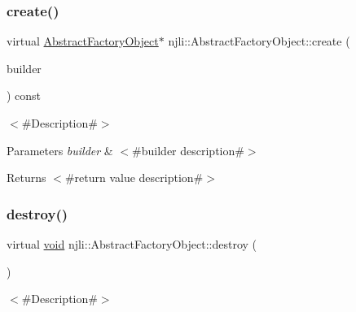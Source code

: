 \subsubsection{\texorpdfstring{create()}{create()}}
{\footnotesize\ttfamily virtual \mbox{\hyperlink{classnjli_1_1_abstract_factory_object}{Abstract\+Factory\+Object}}$\ast$ njli\+::\+Abstract\+Factory\+Object\+::create (\begin{DoxyParamCaption}\item[{const \mbox{\hyperlink{classnjli_1_1_abstract_builder}{Abstract\+Builder}} \&}]{builder }\end{DoxyParamCaption}) const\hspace{0.3cm}{\ttfamily [virtual]}}

$<$\#\+Description\#$>$


\begin{DoxyParams}{Parameters}
{\em builder} & $<$\#builder description\#$>$\\
\hline
\end{DoxyParams}
\begin{DoxyReturn}{Returns}
$<$\#return value description\#$>$ 
\end{DoxyReturn}
\mbox{\label{classnjli_1_1_abstract_factory_object_afec18dff52178eaf73a64764c262d95a}} 
\subsubsection{\texorpdfstring{destroy()}{destroy()}}
{\footnotesize\ttfamily virtual \mbox{\hyperlink{_thread_8h_af1e856da2e658414cb2456cb6f7ebc66}{void}} njli\+::\+Abstract\+Factory\+Object\+::destroy (\begin{DoxyParamCaption}{ }\end{DoxyParamCaption})\hspace{0.3cm}{\ttfamily [virtual]}}

$<$\#\+Description\#$>$ \mbox{\label{classnjli_1_1_abstract_factory_object_a678b8f28320f6a7e2aa38d5ef72889a8}} 
